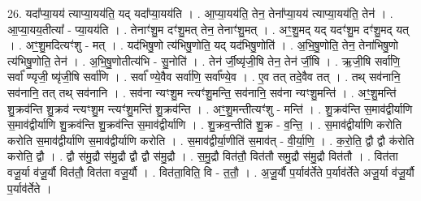 \documentclass[17pt]{extarticle}
\begin{document}
26. यदा᳚प्या॒यय॑ त्याप्या॒यय॑ति॒ यद् यदा᳚प्या॒यय॑ति । . आ॒प्या॒यय॑ति॒ तेन॒ तेना᳚प्या॒यय॑ त्याप्या॒यय॑ति॒ तेन॑ । . आ॒प्या॒यय॒तीत्या᳚ - प्या॒यय॑ति । . तेनाꣳ॑शु॒म दꣳ॑शु॒मत् तेन॒ तेनाꣳ॑शु॒मत् । . अꣳ॒॒शु॒मद् यद् यदꣳ॑शु॒म दꣳ॑शु॒मद् यत् । . अꣳ॒॒शु॒मदित्यꣳ॑शु - मत् । . यद॑भिषु॒णो त्य॑भिषु॒णोति॒ यद् यद॑भिषु॒णोति॑ । . अ॒भि॒षु॒णोति॒ तेन॒ तेना॑भिषु॒णो त्य॑भिषु॒णोति॒ तेन॑ । . अ॒भि॒षु॒णोतीत्य॑भि - सु॒नोति॑ । . तेन॑ र्जी॒ष्यृ॑जी॒षि तेन॒ तेन॑ र्जी॒षि । . ऋ॒जी॒षि सर्वा॑णि॒ सर्वा᳚ ण्यृजी॒ ष्यृ॑जी॒षि सर्वा॑णि । . सर्वा᳚ ण्ये॒वैव सर्वा॑णि॒ सर्वा᳚ण्ये॒व । . ए॒व तत् तदे॒वैव तत् । . तथ् सव॑नानि॒ सव॑नानि॒ तत् तथ् सव॑नानि । . सव॑ना न्यꣳशु॒म न्त्यꣳ॑शु॒मन्ति॒ सव॑नानि॒ सव॑ना न्यꣳशु॒मन्ति॑ । . अꣳ॒॒शु॒मन्ति॑ शु॒क्रव॑न्ति शु॒क्रव॑ न्त्यꣳशु॒म न्त्यꣳ॑शु॒मन्ति॑ शु॒क्रव॑न्ति । . अꣳ॒॒शु॒मन्तीत्यꣳ॑शु - मन्ति॑ । . शु॒क्रव॑न्ति स॒माव॑द्वीर्याणि स॒माव॑द्वीर्याणि शु॒क्रव॑न्ति शु॒क्रव॑न्ति स॒माव॑द्वीर्याणि । . शु॒क्रव॒न्तीति॑ शु॒क्र - व॒न्ति॒ । . स॒माव॑द्वीर्याणि करोति करोति स॒माव॑द्वीर्याणि स॒माव॑द्वीर्याणि करोति । . स॒माव॑द्वीर्या॒णीति॑ स॒माव॑त् - वी॒र्या॒णि॒ । . क॒रो॒ति॒ द्वौ द्वौ क॑रोति करोति॒ द्वौ । . द्वौ स॑मु॒द्रौ स॑मु॒द्रौ द्वौ द्वौ स॑मु॒द्रौ । . स॒मु॒द्रौ वित॑तौ॒ वित॑तौ समु॒द्रौ स॑मु॒द्रौ वित॑तौ । . वित॑ता वजू॒र्या व॑जू॒र्यौ वित॑तौ॒ वित॑ता वजू॒र्यौ । . वित॑ता॒विति॒ वि - त॒तौ॒ । . अ॒जू॒र्यौ प॒र्याव॑र्तेते प॒र्याव॑र्तेते अजू॒र्या व॑जू॒र्यौ प॒र्याव॑र्तेते । \newline
\end{document}
